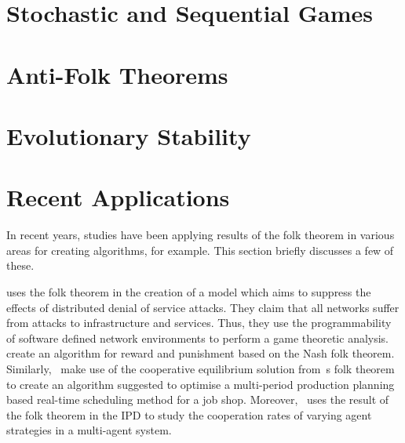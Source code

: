 \section{Stochastic and Sequential Games}\label{sec:Stochastic_and_Sequential_Games}

\section{Anti-Folk Theorems}\label{sec:Anti-Folk_Theorems}

\section{Evolutionary Stability}\label{sec:Evolutionary_Stability}

\section{Recent Applications}\label{sec:Recent_Applications}
In recent years, studies have been applying results of the folk theorem in
various areas for creating algorithms, for example. This section briefly
discusses a few of these.

\cite{Chowdhary2017} uses the folk theorem in the creation of a model which aims
to suppress the effects of distributed denial of service attacks. They claim
that all networks suffer from attacks to infrastructure and services. Thus, they
use the programmability of software defined network environments to perform a
game theoretic analysis. \cite{Chowdhary2017} create an algorithm for reward and
punishment based on the Nash folk theorem. Similarly,~\cite{Wang2020} make use
of the cooperative equilibrium solution from~\cite{Friedman1971}s folk theorem
to create an algorithm suggested to optimise a multi-period production planning
based real-time scheduling method for a job shop. Moreover,~\cite{Wang2018} uses
the result of the folk theorem in the IPD to study the cooperation rates of
varying agent strategies in a multi-agent system.

